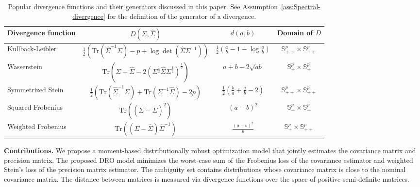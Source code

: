 \documentclass[11pt]{article}
\def\S{\mathbb{S}}
\def\PSD{{\S^k_{++}}}
\def\S{\mathbb{S}}
\def\tr{\mathrm{Tr}}
\def\PSD{{\S^p_{+}}}
\def\PD{{\S^p_{++}}}
\newcommand{\wh}{\widehat}
\begin{document}
\begin{table}[h]
\centering
\renewcommand{\arraystretch}{2}
\begin{tabular}{|l|c|c|c|}
\hline
\textbf{Divergence function} & \(D(\Sigma, {\wh \Sigma})\) & $d(a,b)$ &Domain of $D$\\ \hline
Kullback-Leibler  & 
\(\frac{1}{2} \left( \tr({\wh \Sigma}^{-1}\Sigma) - p + \log\det({\wh \Sigma}\Sigma^{-1}) \right)\) &$\frac{1}{2}\left(\frac{a}{b}-1-\log\frac{a}{b}\right)$ & 
\(\PD \times \PD\)  \\ \hline
Wasserstein  & 
\(\tr\left(\Sigma + {\wh \Sigma} - 2 (\Sigma^{\frac{1}{2}} {\wh \Sigma} \Sigma^{\frac{1}{2}})^{\frac{1}{2}}\right)\) &$a+b-2\sqrt{ab}$ & 
\(\PSD \times \PSD\) \\ \hline
Symmetrized Stein  & 
\(\frac{1}{2} \left( \tr({\wh \Sigma}^{-1} \Sigma) + \tr(\Sigma^{-1} {\wh \Sigma}) - 2p \right)\) &$\frac{1}{2}\left(\frac{b}{a}+\frac{a}{b}-2\right)$
&\(\PD \times \PD\) \\ \hline
Squared Frobenius & 
\(\tr \left( (\Sigma - {\wh \Sigma})^2 \right)\)& $(a-b)^2$ & 
\(\PSD \times \PSD\) \\ \hline
Weighted Frobenius &
\(\tr \left( (\Sigma - {\wh \Sigma}) {\wh \Sigma}^{-1} \right)\)& $\frac{(a-b)^2}{b}$ & 
\(\PSD \times \PD\) \\ \hline
\end{tabular}
\caption{Popular divergence functions and their generators discussed in this paper. See Assumption~\ref{ass:Spectral-divergence} for the definition of the generator of a divergence.}
\label{tab:divergences}
\end{table}

\noindent \textbf{Contributions.}
 We propose a moment-based distributionally robust optimization model that jointly estimates the covariance matrix and precision matrix. The proposed DRO model minimizes the worst-case sum of the Frobenius loss of the covariance estimator and weighted Stein's loss of the precision matrix estimator. The ambiguity set contains distributions whose covariance matrix is close to the nominal covariance matrix. The distance between matrices is measured via divergence functions over the space of positive semi-definite matrices.
\end{document}
